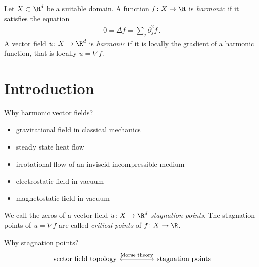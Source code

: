 
\begin{frame}
  \begin{definition}
    Let $X\subset\R^d$ be a suitable domain.
    A function $f\colon X\to\R$ is \emph{harmonic} if it satisfies the equation
    \begin{align*}
      0=\Delta f=\sum_j\partial_j^2f\,.
    \end{align*}
    A vector field $u\colon X\to\R^d$ is \emph{harmonic} if it is locally the gradient of a harmonic function, that is locally $u=\nabla f$.
  \end{definition}
\end{frame}

\section{Introduction}
{
\begin{frame}[fragile]
  \begin{block}{Why harmonic vector fields?}
    \begin{itemize}
      \item gravitational field in classical mechanics
      \item steady state heat flow
      \item irrotational flow of an inviscid incompressible medium
      \item electrostatic field in vacuum
      \item magnetostatic field in vacuum
    \end{itemize}
  \end{block}
\end{frame}
}

\begin{frame}[fragile]
  \begin{definition}
    We call the zeros of a vector field $u\colon X\to\R^d$ \emph{stagnation points}.
    The stagnation points of $u=\nabla f$ are called \emph{critical points} of $f\colon X\to\R$.
  \end{definition}
  \begin{block}{Why stagnation points?}
    \tikzset{external/export=false}
    \[\begin{tikzcd}[column sep=huge]
      \text{vector field topology} \arrow[r,leftrightarrow,"\text{Morse theory}"] &\text{stagnation points}
    \end{tikzcd}\]
  \end{block}
  
\end{frame}

